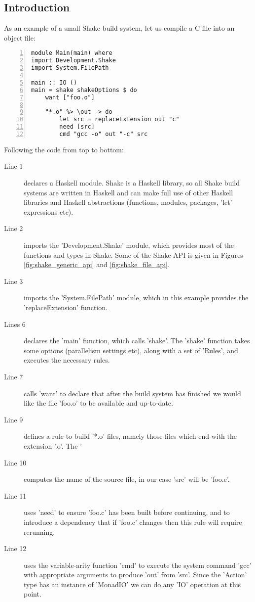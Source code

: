 \subsection{Introduction\label{sec:shake_intro}}

As an example of a small Shake build system, let us compile a C file into an object file:

\begin{lstlisting}[numbers=left,xleftmargin=2em,framexleftmargin=1.5em]
module Main(main) where
import Development.Shake
import System.FilePath

main :: IO ()
main = shake shakeOptions $ do
    want ["foo.o"]

    "*.o" %> \out -> do
        let src = replaceExtension out "c"
        need [src]
        cmd "gcc -o" out "-c" src
\end{lstlisting}

Following the code from top to bottom:

\begin{description}
\item[Line 1] declares a Haskell module. Shake is a Haskell library, so all Shake build systems are written in Haskell and can make full use of other Haskell libraries and Haskell abstractions (functions, modules, packages, \lst'let' expressions etc).
\item[Line 2] imports the \lst'Development.Shake' module, which provides most of the functions and types in Shake. Some of the Shake API is given in Figures \ref{fig:shake_generic_api} and \ref{fig:shake_file_api}.
\item[Line 3] imports the \lst'System.FilePath' module, which in this example provides the \lst'replaceExtension' function.
\item[Lines 6] declares the \lst'main' function, which calls \lst'shake'. The \lst'shake' function takes some options (parallelism settings etc), along with a set of \lst'Rules', and executes the necessary rules.
\item[Line 7] calls \lst'want' to declare that after the build system has finished we would like the file \lst'foo.o' to be available and up-to-date.
\item[Line 9] defines a rule to build \lst'*.o' files, namely those files which end with the extension \lst'.o'. The \lst'%
\item[Line 10] computes the name of the source file, in our case \lst'src' will be \lst'foo.c'.
\item[Line 11] uses \lst'need' to ensure \lst'foo.c' has been built before continuing, and to introduce a dependency that if \lst'foo.c' changes then this rule will require rerunning.
\item[Line 12] uses the variable-arity function \lst'cmd' to execute the system command \lst'gcc' with appropriate arguments to produce \lst'out' from \lst'src'. Since the \lst'Action' type has an instance of \lst'MonadIO' we can do any \lst'IO' operation at this point.
\end{description}

